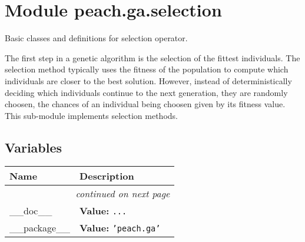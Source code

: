 %
%
%


\section{Module peach.ga.selection}

    \label{peach:ga:selection}

Basic classes and definitions for selection operator.

The first step in a genetic algorithm is the selection of the fittest
individuals. The selection method typically uses the fitness of the population
to compute which individuals are closer to the best solution. However, instead
of deterministically deciding which individuals continue to the next generation,
they are randomly choosen, the chances of an individual being choosen given by
its fitness value. This sub-module implements selection methods.


  \subsection{Variables}

    \vspace{-1cm}
\hspace{\varindent}\begin{longtable}{|p{\varnamewidth}|p{\vardescrwidth}|l}
\cline{1-2}
\cline{1-2} \centering \textbf{Name} & \centering \textbf{Description}& \\
\cline{1-2}
\endhead\cline{1-2}\multicolumn{3}{r}{\small\textit{continued on next page}}\\\endfoot\cline{1-2}
\endlastfoot\raggedright \_\-\_\-d\-o\-c\-\_\-\_\- & \raggedright \textbf{Value:} 
{\tt \texttt{...}}&\\
\cline{1-2}
\raggedright \_\-\_\-p\-a\-c\-k\-a\-g\-e\-\_\-\_\- & \raggedright \textbf{Value:} 
{\tt \texttt{'}\texttt{peach.ga}\texttt{'}}&\\
\cline{1-2}
\end{longtable}


